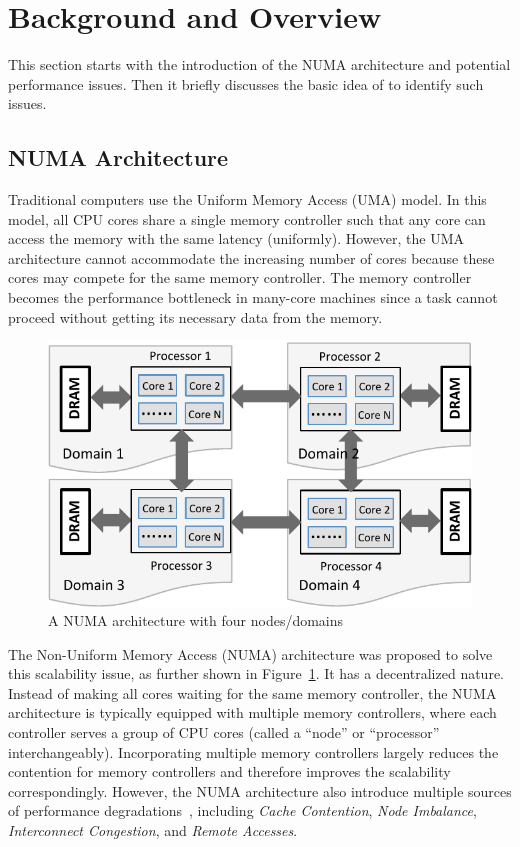 \section{Background and Overview}
\label{sec:overview}

This section starts with the introduction of the NUMA architecture and potential performance issues. Then it briefly discusses the basic idea of \NP{} to identify such issues. 

\subsection{NUMA Architecture}
\label{sec:numa}

Traditional computers use the Uniform Memory Access (UMA) model. In this model, all CPU cores share a single memory controller such that any core can access the memory with the same latency (uniformly). However, the UMA architecture cannot accommodate the increasing number of cores because these cores may compete for the same memory controller. The memory controller becomes the performance bottleneck in many-core machines since a task cannot proceed without getting its necessary data from the memory. 

\begin{figure}[htbp]
\centering
\includegraphics[width=0.9\columnwidth]{paper/figures/Numa.pdf}
\caption{A NUMA architecture with four nodes/domains\label{fig:numa}}
\end{figure}

The Non-Uniform Memory Access (NUMA) architecture was proposed to solve this scalability issue, as further shown in Figure~\ref{fig:numa}. It has a decentralized nature. Instead of making all cores waiting for the same memory controller, the NUMA architecture is typically equipped with multiple memory controllers, where each controller serves a group of CPU cores (called a ``node'' or ``processor'' interchangeably). Incorporating multiple memory controllers largely reduces the contention for memory controllers and therefore improves the scalability correspondingly. However, the NUMA architecture also introduce multiple sources of performance degradations~\cite{Blagodurov:2011:CNC:2002181.2002182}, including \textit{Cache Contention}, \textit{Node Imbalance}, \textit{Interconnect Congestion}, and \textit{Remote Accesses}. 

